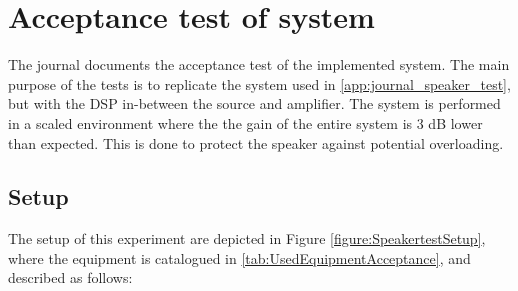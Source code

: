 \chapter{Acceptance test of system}\label{app:acceptance_test}

The journal documents the acceptance test of the implemented system. The main purpose of the tests is to replicate the system used in \autoref{app:journal_speaker_test}, but with the DSP in-between the source and amplifier. The system is performed in a scaled environment where the the gain of the entire system is 3 dB lower than expected. This is done to protect the speaker against potential overloading.

\section{Setup}

The setup of this experiment are depicted in Figure \ref{figure:SpeakertestSetup}, where the equipment is catalogued in \autoref{tab:UsedEquipmentAcceptance}, and described as follows:

